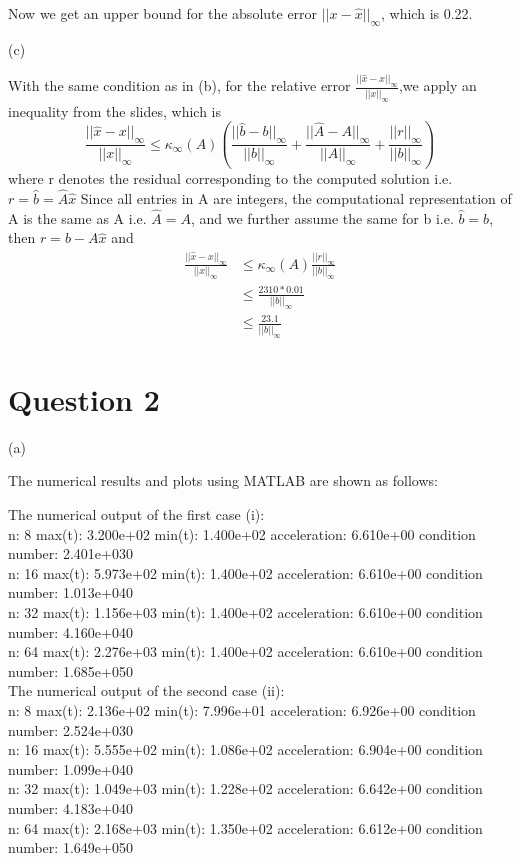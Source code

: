 \documentclass[12pt]{article}
\begin{document}
Now we get an upper bound for the absolute error $||x - \hat{x}||_{\infty}$, which is 0.22.

(c)

With the same condition as in (b), for the relative error $\frac{||\hat{x}-x||_{\infty}}{||x||_{\infty}}$,we apply an inequality from the slides, which is
\begin{equation}
\frac{||\hat{x}-x||_{\infty}}{||x||_{\infty}} \leq \kappa_{\infty}(A)(\frac{||\hat{b}-b||_{\infty}}{||b||_{\infty}}+\frac{||\hat{A}-A||_{\infty}}{||A||_{\infty}}+\frac{||r||_{\infty}}{||b||_{\infty}})
\nonumber
\end{equation}
where r denotes the residual corresponding to the computed solution i.e. $r = \hat{b} = \hat{A}\hat{x}$
Since all entries in A are integers, the computational representation of A is the same as A i.e. $\hat{A} = A$, and we further assume the same for b i.e. $\hat{b} = b$, then $r = b-A\hat{x}$ and
\begin{equation}
\begin{aligned}
\frac{||\hat{x}-x||_{\infty}}{||x||_{\infty}} &\leq \kappa_{\infty}(A)\frac{||r||_{\infty}}{||b||_{\infty}}\\ &\leq \frac{2310*0.01}{||b||_{\infty}}\\
&\leq \frac{23.1}{||b||_{\infty}}
\nonumber
\end{aligned}
\end{equation}

\section{Question 2}

(a)

The numerical results and plots using MATLAB are shown as follows:

The numerical output of the first case (i):\\
n:   8 max(t):  3.200e+02 min(t):  1.400e+02 acceleration:  6.610e+00 condition number:  2.401e+030\\
n:  16 max(t):  5.973e+02 min(t):  1.400e+02 acceleration:  6.610e+00 condition number:  1.013e+040\\
n:  32 max(t):  1.156e+03 min(t):  1.400e+02 acceleration:  6.610e+00 condition number:  4.160e+040\\
n:  64 max(t):  2.276e+03 min(t):  1.400e+02 acceleration:  6.610e+00 condition number:  1.685e+050\\

The numerical output of the second case (ii):\\
n:   8 max(t):  2.136e+02 min(t):  7.996e+01 acceleration:  6.926e+00 condition number:  2.524e+030\\
n:  16 max(t):  5.555e+02 min(t):  1.086e+02 acceleration:  6.904e+00 condition number:  1.099e+040\\
n:  32 max(t):  1.049e+03 min(t):  1.228e+02 acceleration:  6.642e+00 condition number:  4.183e+040\\
n:  64 max(t):  2.168e+03 min(t):  1.350e+02 acceleration:  6.612e+00 condition number:  1.649e+050\\
\end{document}

